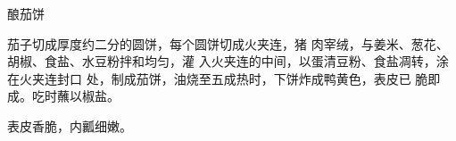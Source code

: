 \begin{recipe}{酿茄饼}

\ingredients


\cooking

茄子切成厚度约二分的圆饼，每个圆饼切成火夹连，猪 肉宰绒，与姜米、葱花、胡椒、食盐、水豆粉拌和均匀，灌 入火夹连的中间，以蛋清豆粉、食盐凋转，涂在火夹连封口 处，制成茄饼，油烧至五成热时，下饼炸成鸭黄色，表皮已 脆即成。吃时蘸以椒盐。

\notes

表皮香脆，内瓤细嫩。

\end{recipe}

